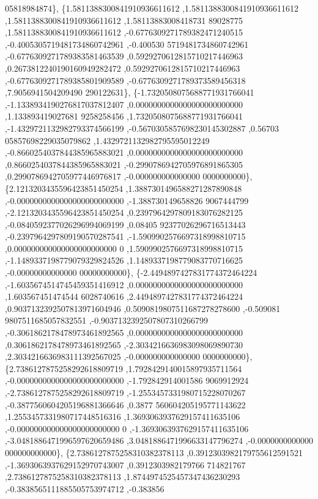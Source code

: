 \begin{DoxyCode}
      05818984874\},
\{1.5811388300841910936611612 ,1.5811388300841910936611612 ,1.5811388300841910936611612 ,1.58113883008418731
      89028775 ,1.5811388300841910936611612 ,-0.6776309271789382471240515 ,-0.4005305719481734860742961 ,-0.400530
      5719481734860742961 ,-0.6776309271789383581463539 ,0.5929270612815710217446963 ,0.2673812240190160949282472 
      ,0.5929270612815710217446963 ,-0.6776309271789385801909589 ,-0.6776309271789373589456318 ,7.9056941504209490
      290122631\},
\{-1.7320508075688771931766041 ,-1.1338934190276817037812407 ,0.0000000000000000000000000 ,1.133893419027681
      9258258456 ,1.7320508075688771931766041 ,-1.4329721132982793374566199 ,-0.5670305857698230145302887 ,0.56703
      05857698229035079862 ,1.4329721132982795595012249 ,-0.8660254037844385965883021 ,0.0000000000000000000000000
       ,0.8660254037844385965883021 ,-0.2990786942705976891865305 ,0.2990786942705977446976817 ,-0.000000000000000
      0000000000\},
\{2.1213203435596423851450254 ,1.3887301496588271287890848 ,-0.0000000000000000000000000 ,-1.388730149658826
      9067444799 ,-2.1213203435596423851450254 ,0.2397964297809183076282125 ,-0.0840592377026296994069199 ,0.08405
      92377026296716513443 ,-0.2397964297809190570287541 ,-1.5909902576697318998810715 ,0.000000000000000000000000
      0 ,1.5909902576697318998810715 ,-1.1489337198779079329824526 ,1.1489337198779083770716625 ,-0.00000000000000
      00000000000\},
\{-2.4494897427831774372464224 ,-1.6035674514745459351416912 ,0.0000000000000000000000000 ,1.603567451474544
      6028740616 ,2.4494897427831774372464224 ,0.9037132392507813971604946 ,0.5090819807511687278278600 ,-0.509081
      9807511685057832551 ,-0.9037132392507807310266799 ,-0.3061862178478973461892565 ,0.0000000000000000000000000
       ,0.3061862178478973461892565 ,-2.3034216636983098069890730 ,2.3034216636983111392567025 ,-0.000000000000000
      0000000000\},
\{2.7386127875258292618809719 ,1.7928429140015897935711564 ,-0.0000000000000000000000000 ,-1.792842914001586
      9069912924 ,-2.7386127875258292618809719 ,-1.2553457331980715228070267 ,-0.3877560604205196881366646 ,0.3877
      560604205195771143622 ,1.2553457331980717448516316 ,1.3693063937629157411635106 ,-0.000000000000000000000000
      0 ,-1.3693063937629157411635106 ,-3.0481886471996597620659486 ,3.0481886471996633147796274 ,-0.0000000000000
      000000000000\},
\{2.7386127875258310382378113 ,0.3912303982179755612591521 ,-1.3693063937629152970743007 ,0.3912303982179766
      714821767 ,2.7386127875258310382378113 ,1.8744974525457347436230293 ,-0.3838565111885505753974712 ,-0.383856

\end{DoxyCode}
